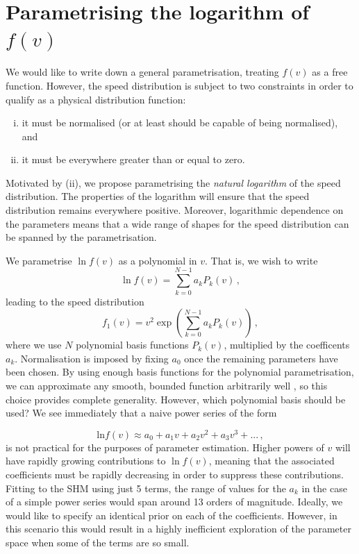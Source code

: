 \section{Parametrising the logarithm of $f(v)$}
\label{sec:Poly:parametrisation}

We would like to write down a general parametrisation, treating $f(v)$ as a free function. However, the speed distribution is subject to two constraints in order to qualify as a physical distribution function:
\begin{enumerate}[(i)]
\item it must be normalised (or at least should be capable of being normalised), and
\item it must be everywhere greater than or equal to zero.
\end{enumerate}
Motivated by (ii), we propose parametrising the \textit{natural logarithm} of the speed distribution. The properties of the logarithm will ensure that the speed distribution remains everywhere positive. Moreover, logarithmic dependence on the parameters means that a wide range of shapes for the speed distribution can be spanned by the parametrisation. 

We parametrise $\ln f(v)$ as a polynomial in $v$. That is, we wish to write
\begin{equation}
\ln f(v) = \sum_{k = 0}^{N-1} a_k P_k(v)\,,
\end{equation}
leading to the speed distribution
\begin{equation}
f_1(v) = v^2 \exp\left( \sum_{k = 0}^{N-1} a_k P_k(v)\right)\,,
\end{equation}
where we use $N$ polynomial basis functions $P_k(v)$, multiplied by the coefficents $a_k$. Normalisation is imposed by fixing $a_0$ once the remaining parameters have been chosen. By using enough basis functions for the polynomial parametrisation, we can approximate any smooth, bounded function arbitrarily well \cite{Press:2007}, so this choice provides complete generality. However, which polynomial basis should be used? We see immediately that a naive power series of the form

\begin{equation}
\textrm{ln}f(v) \approx a_0 + a_1 v + a_2 v^2 + a_3 v^3 + ...\,,
\end{equation}
is not practical for the purposes of parameter estimation. Higher powers of $v$ will have rapidly growing contributions to $\ln f(v)$, meaning that the associated coefficients must be rapidly decreasing in order to suppress these contributions. Fitting to the SHM using just 5 terms, the range of values for the $a_k$ in the case of a simple power series would span around 13 orders of magnitude. Ideally, we would like to specify an identical prior on each of the coefficients. However, in this scenario this would result in a highly inefficient exploration of the parameter space when some of the terms are so small.

